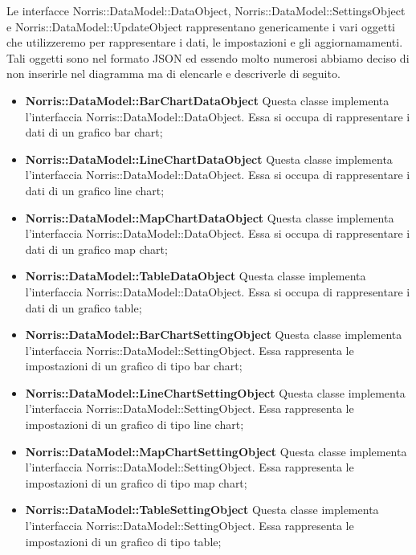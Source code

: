 	Le interfacce Norris::DataModel::DataObject, Norris::DataModel::SettingsObject e \linebreak Norris::DataModel::UpdateObject rappresentano genericamente i vari oggetti che utilizzeremo per rappresentare i dati, le impostazioni e gli aggiornamamenti. Tali oggetti sono nel formato JSON ed essendo molto numerosi abbiamo deciso di non inserirle nel diagramma ma di elencarle e descriverle di seguito.

	\begin{itemize}
		\item \textbf{Norris::DataModel::BarChartDataObject} Questa classe implementa l'interfaccia Norris::DataModel::DataObject. Essa si occupa di rappresentare i dati di un grafico bar chart;

		\item \textbf{Norris::DataModel::LineChartDataObject} Questa classe implementa l'interfaccia Norris::DataModel::DataObject. Essa si occupa di rappresentare i dati di un grafico line chart;

		\item \textbf{Norris::DataModel::MapChartDataObject} Questa classe implementa l'interfaccia Norris::DataModel::DataObject. Essa si occupa di rappresentare i dati di un grafico map chart;

		\item \textbf{Norris::DataModel::TableDataObject} Questa classe implementa l'interfaccia \linebreak Norris::DataModel::DataObject. Essa si occupa di rappresentare i dati di un grafico table;

		\item \textbf{Norris::DataModel::BarChartSettingObject} Questa classe implementa l'interfaccia Norris::DataModel::SettingObject. Essa rappresenta le impostazioni di un grafico di tipo bar chart;

		\item \textbf{Norris::DataModel::LineChartSettingObject} Questa classe implementa l'interfaccia Norris::DataModel::SettingObject. Essa rappresenta le impostazioni di un grafico di tipo line chart;

		\item \textbf{Norris::DataModel::MapChartSettingObject} Questa classe implementa l'interfaccia Norris::DataModel::SettingObject. Essa rappresenta le impostazioni di un grafico di tipo map chart;

		\item \textbf{Norris::DataModel::TableSettingObject} Questa classe implementa l'interfaccia Norris::DataModel::SettingObject. Essa rappresenta le impostazioni di un grafico di tipo table;


\end{itemize}
